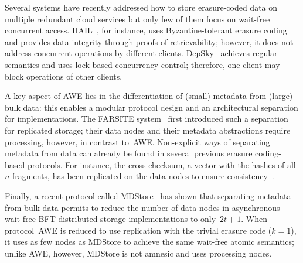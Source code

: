 \documentclass[oribibl]{llncs}
\theoremstyle{definition-boldhead}
\newcommand{\NAME}{AWE\xspace}
\newcommand{\nodes}{nodes\xspace}
\begin{document}
Several systems have recently addressed how to store erasure-coded
data on multiple redundant cloud services but only few of them focus
on wait-free concurrent access.  HAIL~\cite{bojuop09}, for instance,
uses Byzantine-tolerant erasure coding and provides data integrity
through proofs of retrievability; however, it does not address concurrent operations by different clients.  DepSky~\cite{bcqas11}
achieves regular semantics and uses lock-based concurrency control;
therefore, one client may block operations of other clients.

A key aspect of \NAME lies in the differentiation of (small) metadata
from (large) bulk data: this enables a modular protocol design and an
architectural separation for implementations.
The FARSITE system~\cite{abcccd02} first introduced such a separation
for replicated storage; their data \nodes and their metadata
abstractions require processing, however, in contrast to~\NAME. Non-explicit ways of separating metadata from data can already be
found in several previous erasure coding-based protocols.  For
instance, the cross checksum, a vector with the hashes of all $n$
fragments, has been replicated on the data nodes to ensure
consistency~\cite{gwgr04,cactes06}.

Finally, a recent protocol called MDStore~\cite{cadovu13} has shown
that separating metadata from bulk data permits to reduce the number
of data \nodes in asynchronous wait-free BFT distributed storage
implementations to only~$2t+1$.  When protocol~\NAME is reduced to use
replication with the trivial erasure code ($k=1$), it uses as few
\nodes as MDStore to achieve the same wait-free atomic semantics;
unlike \NAME, however, MDStore is not amnesic and uses processing
\nodes.


\newcommand{\Y}{\ensuremath{\checkmark}}
\newcommand{\T}{\ensuremath{^*}}
\end{document}
